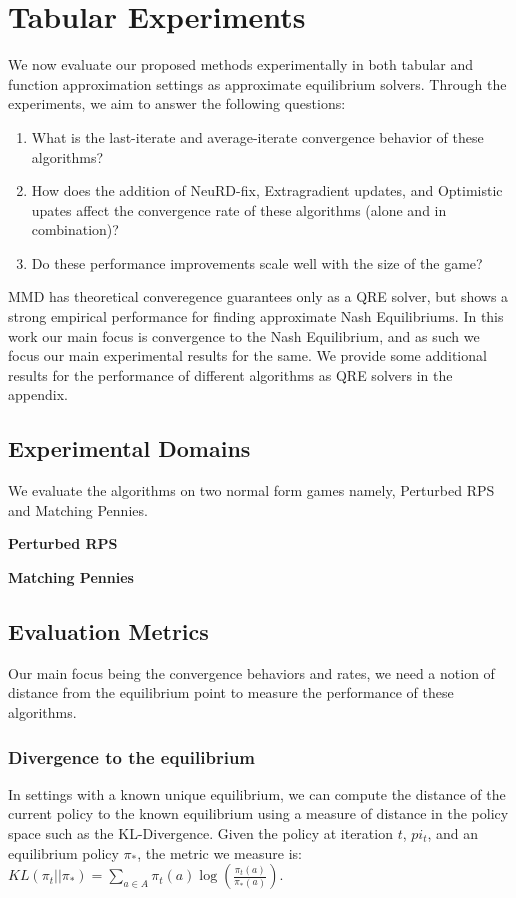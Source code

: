 \chapter{Tabular Experiments}

We now evaluate our proposed methods experimentally in both tabular and function approximation
settings as approximate equilibrium solvers.
Through the experiments, we aim to answer the following questions:
\begin{enumerate}
	\item {What is
	      the last-iterate and average-iterate convergence behavior of these algorithms?
	      }\label{qn1}
	\item {How does the addition of NeuRD-fix, Extragradient updates, and Optimistic upates
	      affect the convergence rate of these algorithms (alone and in combination)?}\label{qn2}
	\item {Do these performance improvements scale well with the size of the game?}\label{qn3}
\end{enumerate}

MMD has theoretical converegence guarantees only as a QRE solver, but shows a strong empirical
performance for finding approximate Nash Equilibriums.
In this work our main focus is convergence to the Nash Equilibrium, and as such we focus our main
experimental results for the same.
We provide some additional results for the performance of different algorithms as QRE solvers in
the appendix.

\section{Experimental Domains}
We evaluate the algorithms on two normal form games namely, Perturbed RPS and Matching Pennies.

\textbf{Perturbed RPS}

\textbf{Matching Pennies}

\section{Evaluation
  Metrics}
Our main focus being the convergence behaviors and rates, we need a notion of distance from the
equilibrium point to measure the performance of these algorithms.

\subsection{Divergence to the equilibrium}
In settings with a known unique equilibrium, we can compute the distance of the current policy to
the known equilibrium using a measure of distance in the policy space such as the KL-Divergence.
Given the policy at iteration $t$, $pi_t$, and an equilibrium policy $\pi_*$, the metric we measure
is: $KL(\pi_t || \pi_*) = \sum_{a \in A} \pi_t(a) \log \left( \frac{\pi_t(a)}{\pi_*(a)} \right)$.


